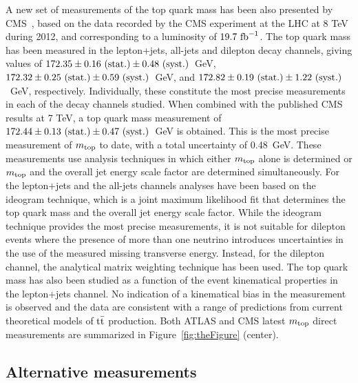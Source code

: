\documentclass{blois}
\begin{document}
A new set of measurements of the top quark mass has been also presented by
CMS~\cite{bib:CMS-topMass8TeV}, based on the data recorded by the CMS experiment
at the LHC at 8 TeV during 2012, and corresponding to a luminosity of
$19.7~{\rm fb}^{-1}$. The top quark mass has been measured in the lepton+jets,
all-jets and dilepton decay channels, giving values of
$172.35 \pm 0.16~({\rm stat.}) \pm 0.48~({\rm syst.})$~GeV,
$172.32 \pm 0.25~({\rm stat.}) \pm 0.59~({\rm syst.})$~GeV, and
$172.82 \pm 0.19~({\rm stat.}) \pm 1.22~({\rm syst.})$~GeV, respectively.
Individually, these constitute the most precise measurements in each of the
decay channels studied. When combined with the published CMS results at 7 TeV,
a top quark mass measurement of
$172.44 \pm 0.13~({\rm stat.}) \pm 0.47~({\rm syst.})$~GeV is obtained. This is
the most precise measurement of $m_{\rm top}$ to date, with a total uncertainty
of 0.48~GeV. These measurements use analysis techniques in which either
$m_{\rm top}$ alone is determined or $m_{\rm top}$ and the overall jet energy
scale factor are determined simultaneously. For the lepton+jets and the all-jets
channels analyses have been based on the ideogram technique, which is a joint
maximum likelihood fit that determines the top quark mass and the overall jet
energy scale factor.
While the ideogram technique provides the most precise measurements, it is not
suitable for dilepton events where the presence of more than one neutrino
introduces uncertainties in the use of the measured missing transverse energy.
Instead, for the dilepton channel, the analytical matrix weighting technique
has been used.
The top quark mass has also been studied as a function of the event
kinematical properties in the lepton+jets channel. No indication of a kinematical
bias in the measurement is observed and the data are consistent with a range of
predictions from current theoretical models of ${\rm t{\bar t}}$ production.
Both ATLAS and CMS latest $m_{\rm top}$ direct measurements are summarized
in Figure~\ref{fig:theFigure} (center).


\subsection{Alternative measurements}
\end{document}
